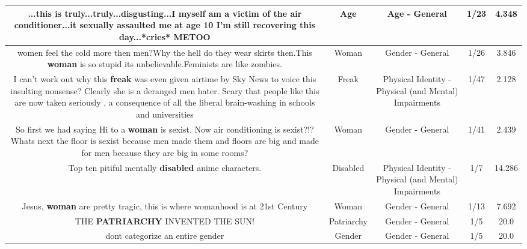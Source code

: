 \documentclass[11pt]{article}
\newlength\mylength
\begin{document}
\begin{center}
\begin{longtable}{|C{.65\mylength}|C{.30\mylength}|C{.12\mylength}|C{.12\mylength}|C{.12\mylength}|}
  \small ...this is truly...truly...disgusting...I myself am a victim of the air conditioner...it sexually assaulted me at \textbf{age} 10 I'm still recovering this day...*cries* METOO\normalsize   & Age & Age - General & 1/23 & 4.348 \\  \hline
  \small women feel the cold more then men?Why the hell do they wear skirts then.This \textbf{woman} is so stupid its unbelievable.Feminists are like zombies.\normalsize   & Woman & Gender - General & 1/26 & 3.846 \\  \hline
  \small I can't work out why this \textbf{freak} was even given airtime by Sky News to voice this insulting nonsense? Clearly she is a deranged men hater.  Scary that people like this are now taken seriously , a consequence of all the liberal brain-washing in schools and universities\normalsize   & Freak & Physical Identity - Physical (and Mental) Impairments & 1/47 & 2.128 \\  \hline
  \small So first we had saying Hi to a \textbf{woman} is sexist. Now air conditioning is sexist?!? Whats next the floor is sexist because men made them and floors are big and made for men because they are big in some rooms?\normalsize   & Woman & Gender - General & 1/41 & 2.439 \\  \hline
  \small Top ten pitiful mentally \textbf{disabled} anime characters.\normalsize   & Disabled & Physical Identity - Physical (and Mental) Impairments & 1/7 & 14.286 \\  \hline
  \small Jesus, \textbf{woman} are pretty tragic, this is where womanhood is at 21st Century\normalsize   & Woman & Gender - General & 1/13 & 7.692 \\  \hline
  \small THE \textbf{PATRIARCHY} INVENTED THE SUN!\normalsize   & Patriarchy & Gender - General & 1/5 & 20.0 \\  \hline
  \small dont categorize an entire gender\normalsize   & Gender & Gender - General & 1/5 & 20.0 \\  \hline

\end{longtable}
\end{center}
\end{document}
